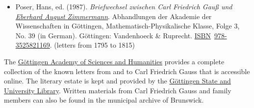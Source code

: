 \begin{itemize}
  \begin{itemize}
  \tightlist
  \item
    {\href{https://books.google.com/books?id=aIRtAAAAMAAJ}{Volumes 1+2} (letters from April 1808 to March 1836)}
  \item
    {\href{https://books.google.com/books?id=NDcDAAAAQAAJ}{Volumes 3+4} (letters from March 1836 to April 1845)}
  \item
    {\href{https://books.google.com/books?id=3jEDAAAAQAAJ}{Volumes 5+6} (letters from April 1845 to November 1850)}
  \end{itemize}
\item
  {Poser, Hans, ed. (1987). \emph{Briefwechsel zwischen Carl Friedrich Gauß und \href{https://en.wikipedia.org/wiki/Eberhard_August_Wilhelm_Zimmermann}{Eberhard August Zimmermann}}. Abhandlungen der Akademie der Wissenschaften in Göttingen, Mathematisch-Physikalische Klasse, Folge 3, No. 39 (in German). Göttingen: Vandenhoeck \& Ruprecht. \href{https://en.wikipedia.org/wiki/ISBN_(identifier)}{ISBN}{~}\href{https://en.wikipedia.org/wiki/Special:BookSources/978-3525821169}{978-3525821169}.{} (letters from 1795 to 1815)}
\end{itemize}

The \href{https://en.wikipedia.org/wiki/Göttingen_Academy_of_Sciences_and_Humanities}{Göttingen Academy of Sciences and Humanities} provides a complete collection of the known letters from and to Carl Friedrich Gauss that is accessible online. The literary estate is kept and provided by the \href{https://en.wikipedia.org/wiki/Göttingen_State_and_University_Library}{Göttingen State and University Library}. Written materials from Carl Friedrich Gauss and family members can also be found in the municipal archive of Brunswick.





